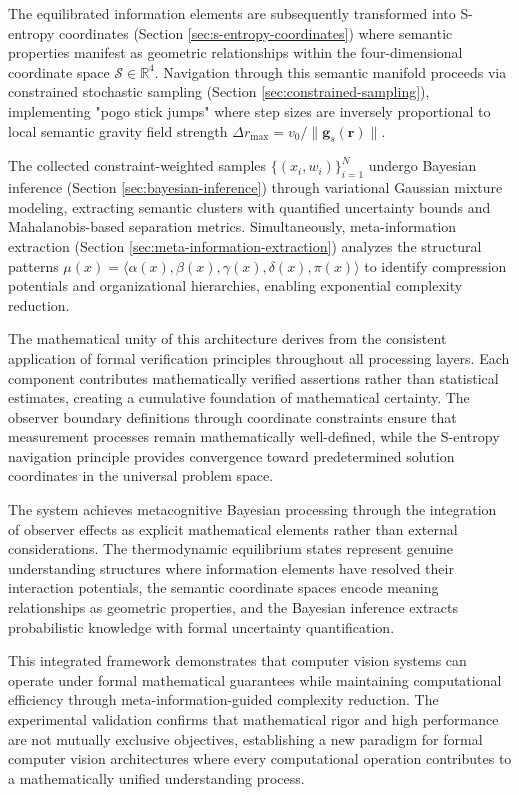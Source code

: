 \documentclass[11pt,a4paper]{article}
\begin{document}
The equilibrated information elements are subsequently transformed into S-entropy coordinates (Section \ref{sec:s-entropy-coordinates}) where semantic properties manifest as geometric relationships within the four-dimensional coordinate space $\mathcal{S} \in \mathbb{R}^4$. Navigation through this semantic manifold proceeds via constrained stochastic sampling (Section \ref{sec:constrained-sampling}), implementing "pogo stick jumps" where step sizes are inversely proportional to local semantic gravity field strength $\Delta r_{\max} = v_0/\|\mathbf{g}_s(\mathbf{r})\|$.

The collected constraint-weighted samples $\{(x_i, w_i)\}_{i=1}^N$ undergo Bayesian inference (Section \ref{sec:bayesian-inference}) through variational Gaussian mixture modeling, extracting semantic clusters with quantified uncertainty bounds and Mahalanobis-based separation metrics. Simultaneously, meta-information extraction (Section \ref{sec:meta-information-extraction}) analyzes the structural patterns $\mu(x) = \langle \alpha(x), \beta(x), \gamma(x), \delta(x), \pi(x) \rangle$ to identify compression potentials and organizational hierarchies, enabling exponential complexity reduction.

The mathematical unity of this architecture derives from the consistent application of formal verification principles throughout all processing layers. Each component contributes mathematically verified assertions rather than statistical estimates, creating a cumulative foundation of mathematical certainty. The observer boundary definitions through coordinate constraints ensure that measurement processes remain mathematically well-defined, while the S-entropy navigation principle provides convergence toward predetermined solution coordinates in the universal problem space.

The system achieves metacognitive Bayesian processing through the integration of observer effects as explicit mathematical elements rather than external considerations. The thermodynamic equilibrium states represent genuine understanding structures where information elements have resolved their interaction potentials, the semantic coordinate spaces encode meaning relationships as geometric properties, and the Bayesian inference extracts probabilistic knowledge with formal uncertainty quantification.

This integrated framework demonstrates that computer vision systems can operate under formal mathematical guarantees while maintaining computational efficiency through meta-information-guided complexity reduction. The experimental validation confirms that mathematical rigor and high performance are not mutually exclusive objectives, establishing a new paradigm for formal computer vision architectures where every computational operation contributes to a mathematically unified understanding process.
\end{document}
